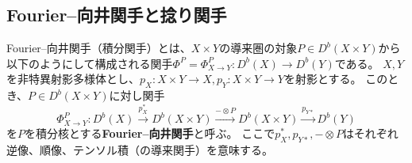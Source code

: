 \documentclass[uplatex,a4paper,dvipdfmx]{jsarticle}
\numberwithin{equation}{section}
\theoremstyle{definition}
\begin{document}
\subsection{Fourier--向井関手と捻り関手}
Fourier--向井関手（積分関手）とは、$X \times Y$の導来圏の対象$P \in D^b(X \times Y)$から以下のようにして構成される関手$\Phi^P =\Phi^P_{X \to Y}\colon D^b(X) \to D^b(Y)$である。
$X, Y$を非特異射影多様体とし、$p_X \colon X\times Y \to X, p_Y \colon X \times Y \to Y$を射影とする。
このとき、$P \in D^b(X \times Y)$に対し関手
\begin{equation}
	\Phi^P_{X \to Y} \colon D^b(X) \xrightarrow{p_X^*} D^b(X \times Y) \xrightarrow{ - \otimes P} D^b(X \times Y) \xrightarrow{p_{Y*}} D^b(Y)
\end{equation}
を$P$を積分核とする\textbf{Fourier--向井関手}と呼ぶ。
ここで$p_X^*, p_{Y*}, - \otimes P$はそれぞれ逆像、順像、テンソル積（の導来関手）を意味する。
\end{document}

